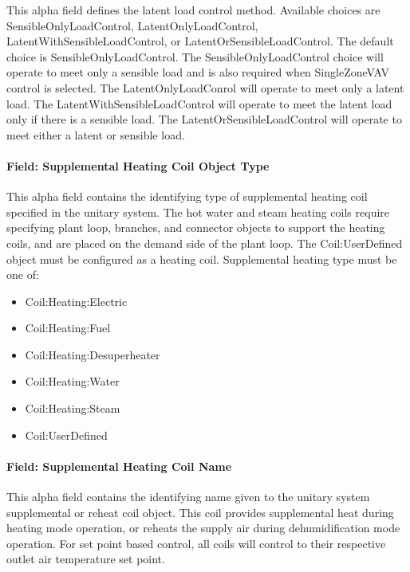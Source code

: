 This alpha field defines the latent load control method. Available choices are SensibleOnlyLoadControl, LatentOnlyLoadControl, LatentWithSensibleLoadControl, or LatentOrSensibleLoadControl. The default choice is SensibleOnlyLoadControl. The SensibleOnlyLoadControl choice will operate to meet only a sensible load and is also required when SingleZoneVAV control is selected. The LatentOnlyLoadConrol will operate to meet only a latent load. The LatentWithSensibleLoadControl will operate to meet the latent load only if there is a sensible load. The LatentOrSensibleLoadControl will operate to meet either a latent or sensible load.

\paragraph{Field: Supplemental Heating Coil Object Type}\label{field-supplemental-heating-coil-object-type}

This alpha field contains the identifying type of supplemental heating coil specified in the unitary system. The hot water and steam heating coils require specifying plant loop, branches, and connector objects to support the heating coils, and are placed on the demand side of the plant loop. The Coil:UserDefined object must be configured as a heating coil. Supplemental heating type must be one of:

\begin{itemize}
\item
  Coil:Heating:Electric
\item
  Coil:Heating:Fuel
\item
  Coil:Heating:Desuperheater
\item
  Coil:Heating:Water
\item
  Coil:Heating:Steam
\item
  Coil:UserDefined
\end{itemize}

\paragraph{Field: Supplemental Heating Coil Name}\label{field-supplemental-heating-coil-name}

This alpha field contains the identifying name given to the unitary system supplemental or reheat coil object. This coil provides supplemental heat during heating mode operation, or reheats the supply air during dehumidification mode operation. For set point based control, all coils will control to their respective outlet air temperature set point.

